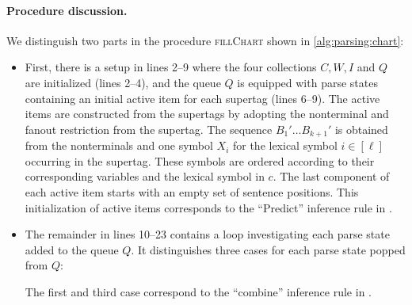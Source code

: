 \documentclass[../../document.tex]{subfiles}
\begin{document}
    \paragraph{Procedure discussion.} We distinguish two parts in the procedure \textsc{fillChart} shown in \cref{alg:parsing:chart}:
    \begin{itemize}
        \item First, there is a setup in lines 2--9 where the four collections \(C, W, I\) and \(Q\) are initialized (lines 2--4), and the queue \(Q\) is equipped with parse states containing an initial active item for each supertag (lines 6--9).
            The active items are constructed from the supertags by adopting the  nonterminal and fanout restriction from the supertag.
            The sequence \(B_1' \ldots B_{k+1}'\) is obtained from the  nonterminals and one symbol \(X_i\) for the lexical symbol \(i \in [\ell]\) occurring in the supertag.
            These symbols are ordered according to their corresponding variables and the lexical symbol in \(c\).
            The last component of each active item starts with an empty set of sentence positions.
            This initialization of active items corresponds to the ``Predict'' inference rule in .
        \item
            The remainder in lines 10--23 contains a loop investigating each parse state added to the queue \(Q\).
            It distinguishes three cases for each parse state popped from \(Q\):
            The first and third case correspond to the ``combine'' inference rule in .
    \end{itemize}
\end{document}
